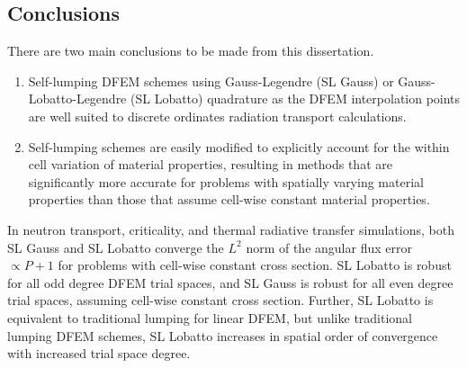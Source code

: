 \subsection{Conclusions}

There are two main conclusions to be made from this dissertation.
\begin{enumerate}
\item Self-lumping DFEM schemes using Gauss-Legendre (SL Gauss) or Gauss-Lobatto-Legendre (SL Lobatto) quadrature as the DFEM interpolation points are well suited to discrete ordinates radiation transport calculations.
\item Self-lumping schemes are easily modified to explicitly account for the within cell variation of material properties, resulting in methods that are significantly more accurate for problems with spatially varying material properties than those that assume cell-wise constant material properties.
\end{enumerate}

In neutron transport, criticality, and thermal radiative transfer simulations, both SL Gauss and SL Lobatto converge the $L^2$ norm of the angular flux error $\propto P+1$ for problems with cell-wise constant cross section.
SL Lobatto is robust for all odd degree DFEM trial spaces, and SL Gauss is robust for all even degree trial spaces, assuming cell-wise constant cross section.
Further, SL Lobatto is equivalent to traditional lumping for linear DFEM, but unlike traditional lumping DFEM schemes, SL Lobatto increases in spatial order of convergence with increased trial space degree.

